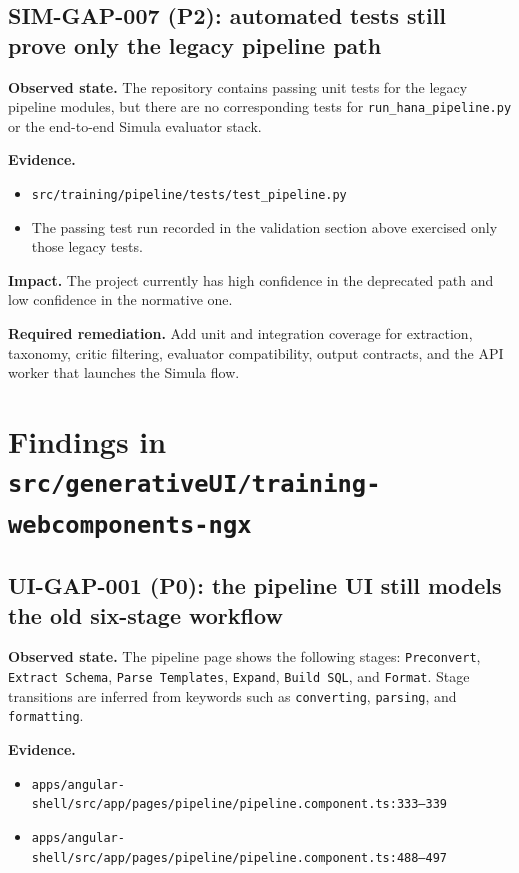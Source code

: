 \subsection*{SIM-GAP-007 (P2): automated tests still prove only the legacy pipeline path}
\textbf{Observed state.}
The repository contains passing unit tests for the legacy pipeline
modules, but there are no corresponding tests for
\texttt{run\_hana\_pipeline.py} or the end-to-end Simula evaluator
stack.

\textbf{Evidence.}
\begin{itemize}
  \item \texttt{src/training/pipeline/tests/test\_pipeline.py}
  \item The passing test run recorded in the validation section above
    exercised only those legacy tests.
\end{itemize}

\textbf{Impact.}
The project currently has high confidence in the deprecated path and
low confidence in the normative one.

\textbf{Required remediation.}
Add unit and integration coverage for extraction, taxonomy, critic
filtering, evaluator compatibility, output contracts, and the API
worker that launches the Simula flow.

\section{Findings in \texttt{src/generativeUI/training-webcomponents-ngx}}

\subsection*{UI-GAP-001 (P0): the pipeline UI still models the old six-stage workflow}
\textbf{Observed state.}
The pipeline page shows the following stages:
\texttt{Preconvert}, \texttt{Extract Schema}, \texttt{Parse
Templates}, \texttt{Expand}, \texttt{Build SQL}, and
\texttt{Format}. Stage transitions are inferred from keywords such as
\texttt{converting}, \texttt{parsing}, and \texttt{formatting}.

\textbf{Evidence.}
\begin{itemize}
  \item \texttt{apps/angular-shell/src/app/pages/pipeline/pipeline.component.ts:333--339}
  \item \texttt{apps/angular-shell/src/app/pages/pipeline/pipeline.component.ts:488--497}
\end{itemize}


